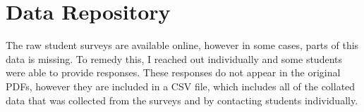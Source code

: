 \providecommand{\heading}[1]{\section{#1}}
\providecommand{\subheading}[1]{\subsection{#1}}

\providecommand{\survey}[1]{
    
            
        
            
        
            

            
}

\section{Data Repository}
    The raw student surveys are available online, however in some cases, parts of this data is missing. 
    To remedy this, I reached out individually and some students were able to provide responses. 
    These responses do not appear in the original PDFs, however they are included in a CSV file, which includes all of the collated data that was collected from the surveys and by contacting students individually. 

